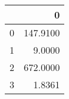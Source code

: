 \begin{tabular}{lr}
\toprule
{} &         0 \\
\midrule
0 &  147.9100 \\
1 &    9.0000 \\
2 &  672.0000 \\
3 &    1.8361 \\
\bottomrule
\end{tabular}

